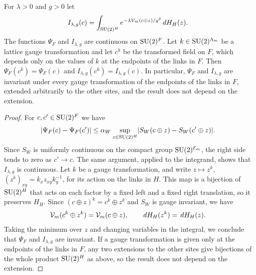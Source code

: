 \begin{lemma}\label{ch19:lem:wilson-minimum}
For $\lambda>0$ and $g>0$ let
\[
 I_{\lambda,g}(c)=\int_{\mathrm{SU}(2)^H}e^{-\lambda\mathcal V_m(c\oplus z)/g^2}\,dH_H(z).
\]
The functions $\Psi_F$ and $I_{\lambda,g}$ are continuous on $\mathrm{SU}(2)^F$. Let $k\in\mathrm{SU}(2)^{\Lambda_{m}}$ be a lattice gauge transformation and let $c^k$ be the transformed field on $F$, which depends only on the values of $k$ at the endpoints of the links in $F$. Then $\Psi_F(c^k)=\Psi_F(c)$ and $I_{\lambda,g}(c^k)=I_{\lambda,g}(c)$. In particular, $\Psi_F$ and $I_{\lambda,g}$ are invariant under every gauge transformation of the endpoints of the links in $F$, extended arbitrarily to the other sites, and the result does not depend on the extension.
\end{lemma}

\begin{proof}
For $c,c'\in\mathrm{SU}(2)^F$ we have
\[
 \lvert \Psi_F(c)-\Psi_F(c')\rvert\le\alpha_W\sup_{z\in\mathrm{SU}(2)^H}\lvert S_W(c\oplus z)-S_W(c'\oplus z)\rvert.
\]
Since $S_W$ is uniformly continuous on the compact group $\mathrm{SU}(2)^{\mathcal E_{m}}$, the right side tends to zero as $c'\to c$. The same argument, applied to the integrand, shows that $I_{\lambda,g}$ is continuous. Let $k$ be a gauge transformation, and write $z\mapsto z^k$, $(z^k)_{xy}=k_xz_{xy}k_y^{-1}$, for its action on the links in $H$. This map is a bijection of $\mathrm{SU}(2)^H$ that acts on each factor by a fixed left and a fixed right translation, so it preserves $H_H$. Since $(c\oplus z)^k=c^k\oplus z^k$ and $S_W$ is gauge invariant, we have
\[
 \mathcal V_m(c^k\oplus z^k)=\mathcal V_m(c\oplus z),\qquad\,dH_H(z^k)=\,dH_H(z).
\]
Taking the minimum over $z$ and changing variables in the integral, we conclude that $\Psi_F$ and $I_{\lambda,g}$ are invariant. If a gauge transformation is given only at the endpoints of the links in $F$, any two extensions to the other sites give bijections of the whole product $\mathrm{SU}(2)^H$ as above, so the result does not depend on the extension.
\end{proof}

